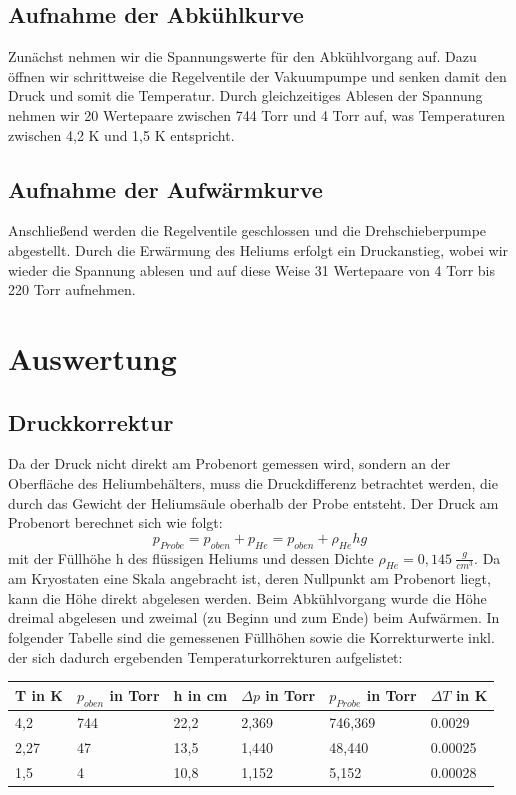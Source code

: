 \documentclass[bigchapter,colorback,accentcolor=tud4b,linedtoc,11pt]{tudreport}
\begin{document}
\section{Aufnahme der Abkühlkurve}

Zunächst nehmen wir die Spannungswerte für den Abkühlvorgang auf. Dazu öffnen wir schrittweise die Regelventile der Vakuumpumpe und senken damit den Druck und somit die Temperatur. Durch gleichzeitiges Ablesen der Spannung nehmen wir 20 Wertepaare zwischen 744 Torr und 4 Torr auf, was Temperaturen zwischen 4,2 K und 1,5 K entspricht.

\section{Aufnahme der Aufwärmkurve}

Anschließend werden die Regelventile geschlossen und die Drehschieberpumpe abgestellt. Durch die Erwärmung des Heliums erfolgt ein Druckanstieg, wobei wir wieder die Spannung ablesen und auf diese Weise 31 Wertepaare von 4 Torr bis 220 Torr aufnehmen.

\chapter{Auswertung}

\section{Druckkorrektur}

Da der Druck nicht direkt am Probenort gemessen wird, sondern an der Oberfläche des Heliumbehälters, muss die Druckdifferenz betrachtet werden, die durch das Gewicht der Heliumsäule oberhalb der Probe entsteht. Der Druck am Probenort berechnet sich wie folgt: 
$$p_{Probe} = p_{oben} + p_{He} = p_{oben} + \rho_{He} h g$$
mit der Füllhöhe h des flüssigen Heliums und dessen Dichte $\rho_{He} = 0,145 ~ \frac{g}{cm^3}$. Da am Kryostaten eine Skala angebracht ist, deren Nullpunkt am Probenort liegt, kann die Höhe direkt abgelesen werden. Beim Abkühlvorgang wurde die Höhe dreimal abgelesen und zweimal (zu Beginn und zum Ende) beim Aufwärmen. In folgender Tabelle sind die gemessenen Füllhöhen sowie die Korrekturwerte inkl. der sich dadurch ergebenden Temperaturkorrekturen aufgelistet:

\begin{center}
  \begin{tabular}{p{1.6cm}|p{2.4cm}|p{1.6cm}|p{2cm}|p{2.4cm}|p{2cm}}
    T in K & $p_{oben}$ in Torr & h in cm & $\Delta p$ in Torr & $p_{Probe}$ in Torr & $\Delta T$ in K  \\ \hline
    4,2    & 744                & 22,2    & 2,369              & 746,369             & 0.0029           \\ \hline
    2,27   & 47                 & 13,5    & 1,440              & 48,440              & 0.00025          \\ \hline
    1,5    & 4                  & 10,8    & 1,152              & 5,152               & 0.00028          \\
	\end{tabular}
\end{center}
\end{document}
